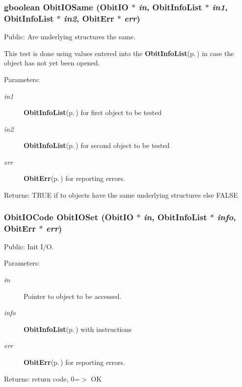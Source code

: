 \subsubsection{\setlength{\rightskip}{0pt plus 5cm}gboolean Obit\-IOSame ({\bf Obit\-IO} $\ast$ {\em in}, {\bf Obit\-Info\-List} $\ast$ {\em in1}, {\bf Obit\-Info\-List} $\ast$ {\em in2}, {\bf Obit\-Err} $\ast$ {\em err})}\label{ObitIO_8h_a31}


Public: Are underlying structures the same. 

This test is done using values entered into the {\bf Obit\-Info\-List}{\rm (p.\,\pageref{structObitInfoList})} in case the object has not yet been opened. \begin{Desc}
\item[Parameters:]
\begin{description}
\item[{\em in1}]{\bf Obit\-Info\-List}{\rm (p.\,\pageref{structObitInfoList})} for first object to be tested \item[{\em in2}]{\bf Obit\-Info\-List}{\rm (p.\,\pageref{structObitInfoList})} for second object to be tested \item[{\em err}]{\bf Obit\-Err}{\rm (p.\,\pageref{structObitErr})} for reporting errors. \end{description}
\end{Desc}
\begin{Desc}
\item[Returns:]TRUE if to objects have the same underlying structures else FALSE \end{Desc}
\subsubsection{\setlength{\rightskip}{0pt plus 5cm}Obit\-IOCode Obit\-IOSet ({\bf Obit\-IO} $\ast$ {\em in}, {\bf Obit\-Info\-List} $\ast$ {\em info}, {\bf Obit\-Err} $\ast$ {\em err})}\label{ObitIO_8h_a37}


Public: Init I/O. 

\begin{Desc}
\item[Parameters:]
\begin{description}
\item[{\em in}]Pointer to object to be accessed. \item[{\em info}]{\bf Obit\-Info\-List}{\rm (p.\,\pageref{structObitInfoList})} with instructions \item[{\em err}]{\bf Obit\-Err}{\rm (p.\,\pageref{structObitErr})} for reporting errors. \end{description}
\end{Desc}
\begin{Desc}
\item[Returns:]return code, 0=$>$ OK \end{Desc}
